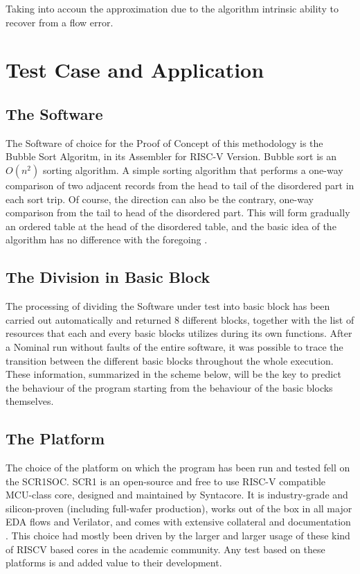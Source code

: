 \documentclass[./dissertation.tex]{subfiles}
\begin{document}
Taking into accoun the approximation due to the algorithm intrinsic ability to recover from a flow error.

%
%

\section{Test Case and Application}
\label{sec:testcase}
\subsection{The Software}
The Software of choice for the Proof of Concept of this methodology is the Bubble Sort Algoritm, in its Assembler for RISC-V Version. Bubble sort is an $O(n^2)$ sorting algorithm. A simple sorting algorithm that performs a one-way comparison of two adjacent records from the head to tail of the disordered part in each sort trip. Of course, the direction can also be the contrary, one-way comparison from the tail to head of the disordered part. This will form gradually an ordered table at the head of the disordered table, and the basic idea of the algorithm has no difference with the foregoing \cite{5635119}.


\subsection{The Division in Basic Block}
The processing of dividing the Software under test into basic block has been carried out automatically and returned 8 different blocks, together with the list of resources that each and every basic blocks utilizes during its own functions.
After a Nominal run without faults of the entire software, it was possible to trace the transition between the different basic blocks throughout the whole execution. These information, summarized in the scheme below, will be the key to predict the behaviour of the program starting from the behaviour of the basic blocks themselves.




\subsection{The Platform}
The choice of the platform on which the program has been run and tested fell on the SCR1SOC. SCR1 is an open-source and free to use RISC-V compatible MCU-class core, designed and maintained by Syntacore. It is industry-grade and silicon-proven (including full-wafer production), works out of the box in all major EDA flows and Verilator, and comes with extensive collateral and documentation \cite{}. This choice had mostly been driven by the larger and larger usage of these kind of RISCV based cores in the academic community. Any test based on these platforms is and added value to their development. 
\end{document}
